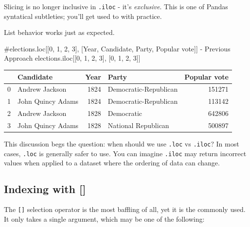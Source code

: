 \documentclass[
  letterpaper,
  DIV=11,
  numbers=noendperiod]{scrreprt}
\newenvironment{Shaded}{\begin{snugshade}}{\end{snugshade}}
\newcommand{\CommentTok}[1]{\textcolor[rgb]{0.37,0.37,0.37}{#1}}
\newcommand{\DecValTok}[1]{\textcolor[rgb]{0.68,0.00,0.00}{#1}}
\newcommand{\NormalTok}[1]{\textcolor[rgb]{0.00,0.23,0.31}{#1}}
\begin{document}
Slicing is no longer inclusive in \texttt{.iloc} - it's
\emph{exclusive}. This is one of Pandas syntatical subtleties; you'll
get used to with practice.

List behavior works just as expected.

\begin{Shaded}
\begin{Highlighting}[]
\CommentTok{\#elections.loc[[0, 1, 2, 3], [\textquotesingle{}Year\textquotesingle{}, \textquotesingle{}Candidate\textquotesingle{}, \textquotesingle{}Party\textquotesingle{}, \textquotesingle{}Popular vote\textquotesingle{}]] {-} Previous Approach}
\NormalTok{elections.iloc[[}\DecValTok{0}\NormalTok{, }\DecValTok{1}\NormalTok{, }\DecValTok{2}\NormalTok{, }\DecValTok{3}\NormalTok{], [}\DecValTok{0}\NormalTok{, }\DecValTok{1}\NormalTok{, }\DecValTok{2}\NormalTok{, }\DecValTok{3}\NormalTok{]]}
\end{Highlighting}
\end{Shaded}

\begin{tabular}{llrlr}
\toprule
{} &          Candidate &  Year &                  Party &  Popular vote \\
\midrule
0 &     Andrew Jackson &  1824 &  Democratic-Republican &        151271 \\
1 &  John Quincy Adams &  1824 &  Democratic-Republican &        113142 \\
2 &     Andrew Jackson &  1828 &             Democratic &        642806 \\
3 &  John Quincy Adams &  1828 &    National Republican &        500897 \\
\bottomrule
\end{tabular}

This discussion begs the question: when should we use \texttt{.loc} vs
\texttt{.iloc}? In most cases, \texttt{.loc} is generally safer to use.
You can imagine \texttt{.iloc} may return incorrect values when applied
to a dataset where the ordering of data can change.

\hypertarget{indexing-with}{%
\subsection{Indexing with {[}{]}}\label{indexing-with}}

The \texttt{{[}{]}} selection operator is the most baffling of all, yet
it is the commonly used. It only takes a single argument, which may be
one of the following:
\end{document}
